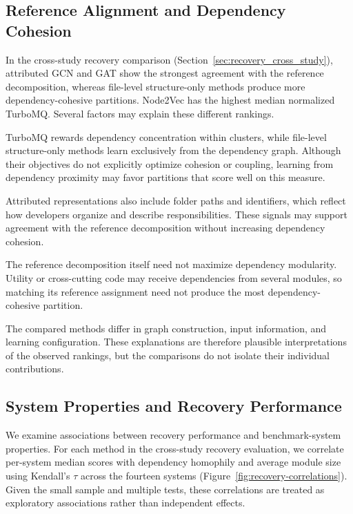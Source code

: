 \subsection{Reference Alignment and Dependency Cohesion}

In the cross-study recovery comparison (Section~\ref{sec:recovery_cross_study}), attributed GCN and GAT show the strongest agreement with the reference decomposition, whereas file-level structure-only methods produce more dependency-cohesive partitions. Node2Vec has the highest median normalized TurboMQ. Several factors may explain these different rankings.

TurboMQ rewards dependency concentration within clusters, while file-level structure-only methods learn exclusively from the dependency graph. Although their objectives do not explicitly optimize cohesion or coupling, learning from dependency proximity may favor partitions that score well on this measure.

Attributed representations also include folder paths and identifiers, which reflect how developers organize and describe responsibilities. These signals may support agreement with the reference decomposition without increasing dependency cohesion.

The reference decomposition itself need not maximize dependency modularity. Utility or cross-cutting code may receive dependencies from several modules, so matching its reference assignment need not produce the most dependency-cohesive partition.

The compared methods differ in graph construction, input information, and learning configuration. These explanations are therefore plausible interpretations of the observed rankings, but the comparisons do not isolate their individual contributions.
\subsection{System Properties and Recovery Performance}

We examine associations between recovery performance and benchmark-system properties. For each method in the cross-study recovery evaluation, we correlate per-system median scores with dependency homophily and average module size using Kendall's $\tau$ across the fourteen systems (Figure~\ref{fig:recovery-correlations}). Given the small sample and multiple tests, these correlations are treated as exploratory associations rather than independent effects.

